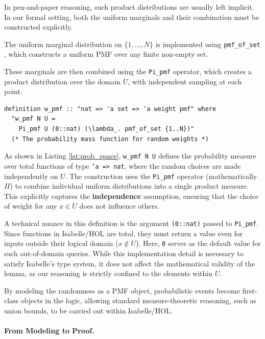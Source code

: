 In pen-and-paper reasoning, such product distributions are usually left implicit.
In our formal setting, both the uniform marginals and their combination must be constructed explicitly.

The uniform marginal distribution on $\{1, \dots, N\}$ is implemented using \texttt{pmf\_of\_set} \cite{isabelleprob}, which constructs a uniform PMF over any finite non-empty set.

These marginals are then combined using the \texttt{Pi\_pmf} operator, which creates a product distribution over the domain $U$, with independent sampling at each point.

\listingneedspace
\begin{lstlisting}[language=Isabelle, caption={Construction of the Weight Probability Space}, label={lst:prob_space}]
definition w_pmf :: "nat => 'a set => 'a weight pmf" where
  "w_pmf N U = 
    Pi_pmf U (0::nat) (\lambda_. pmf_of_set {1..N})"
  (* The probability mass function for random weights *)
\end{lstlisting}

As shown in Listing \ref{lst:prob_space}, \texttt{w\_pmf N U} defines the probability measure over total functions of type \texttt{'a => nat}, where the random choices are made independently on $U$.
The construction uses the \texttt{Pi\_pmf} operator (mathematically $\Pi$) to combine individual uniform distributions into a single product measure.
This explicitly captures the \textbf{independence} assumption, ensuring that the choice of weight for any $x \in U$ does not influence others.

A technical nuance in this definition is the argument \texttt{(0::nat)} passed to \texttt{Pi\_pmf}. 
Since functions in Isabelle/HOL are total, they must return a value even for inputs outside their logical domain ($x \notin U$). Here, \texttt{0} serves as the default value for such out-of-domain queries.
While this implementation detail is necessary to satisfy Isabelle's type system, it does not affect the mathematical validity of the lemma, as our reasoning is strictly confined to the elements within $U$.

By modeling the randomness as a PMF object, probabilistic events become first-class objects in the logic, allowing standard measure-theoretic reasoning, such as union bounds, to be carried out within Isabelle/HOL.

\paragraph{From Modeling to Proof.}

